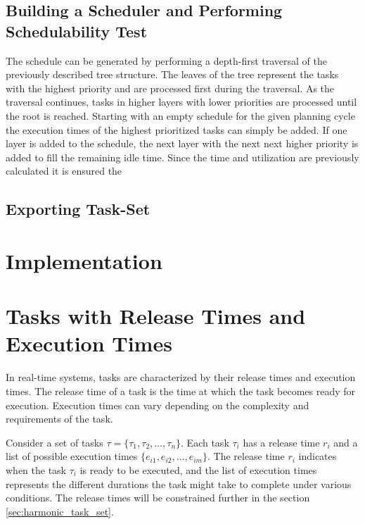 \subsection{Building a Scheduler and Performing Schedulability Test}\label{sec:concept_scheduler}
The schedule can be generated by performing a depth-first traversal of the previously described tree structure.
The leaves of the tree represent the tasks with the highest priority and are processed first during the traversal.
As the traversal continues, tasks in higher layers with lower priorities are processed until the root is reached.
Starting with an empty schedule for the given planning cycle the execution times of the highest prioritized tasks can simply be added.
If one layer is added to the schedule, the next layer with the next next higher priority is added to fill the remaining idle time.
Since the time and utilization are previously calculated it is ensured the 



\subsection{Exporting Task-Set}\label{sec:exporting_task_set}

\section{Implementation}
\label{sec:implementation}


\section{Tasks with Release Times and Execution Times}
\label{sec:tasks_release_execution}

In real-time systems, tasks are characterized by their release times and execution times.
The release time of a task is the time at which the task becomes ready for execution.
Execution times can vary depending on the complexity and requirements of the task.

Consider a set of tasks \( \tau = \{\tau_1, \tau_2, \ldots, \tau_n\} \).
Each task \( \tau_i \) has a release time \( r_i \) and a list of possible execution times \( \{e_{i1}, e_{i2}, \ldots, e_{im}\} \).
The release time \( r_i \) indicates when the task \( \tau_i \) is ready to be executed, and the list of execution times represents the different durations the task might take to complete under various conditions.
The release times will be constrained further in the section \cref{sec:harmonic_task_set}.

